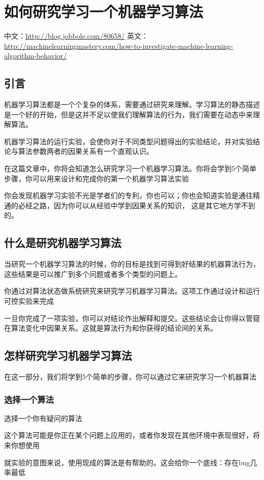 \chapter{如何研究学习一个机器学习算法}
中文：\url{http://blog.jobbole.com/80658/}
英文：\url{http://machinelearningmastery.com/how-to-investigate-machine-learning-algorithm-behavior/}
\section{引言}
机器学习算法都是一个个复杂的体系，需要通过研究来理解。学习算法的静态描述是一个好的开始，但是这并不足以使我们理解算法的行为，我们需要在动态中来理解算法。

机器学习算法的运行实验，会使你对于不同类型问题得出的实验结论，并对实验结论与算法参数两者的因果关系有一个直观认识。

在这篇文章中，你将会知道怎么研究学习一个机器学习算法。你将会学到5个简单步骤，你可以用来设计和完成你的第一个机器学习算法实验

你会发现机器学习实验不光是学者们的专利，你也可以；你也会知道实验是通往精通的必经之路，因为你可以从经验中学到因果关系的知识， 这是其它地方学不到的。

\section{什么是研究机器学习算法}
当研究一个机器学习算法的时候，你的目标是找到可得到好结果的机器算法行为，这些结果是可以推广到多个问题或者多个类型的问题上。

你通过对算法状态做系统研究来研究学习机器学习算法。这项工作通过设计和运行可控实验来完成

一旦你完成了一项实验，你可以对结论作出解释和提交。这些结论会让你得以管窥在算法变化中因果关系。这就是算法行为和你获得的结论间的关系。

\section{怎样研究学习机器学习算法}
在这一部分，我们将学到5个简单的步骤，你可以通过它来研究学习一个机器算法
\subsection{选择一个算法}
选择一个你有疑问的算法

这个算法可能是你正在某个问题上应用的，或者你发现在其他环境中表现很好，将来你想使用

就实验的意图来说，使用现成的算法是有帮助的。这会给你一个底线：存在bug几率最低

